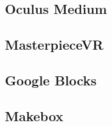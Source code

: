 \subsection{Oculus Medium}
\subsection{MasterpieceVR}
\subsection{Google Blocks}
\subsection{Makebox}




